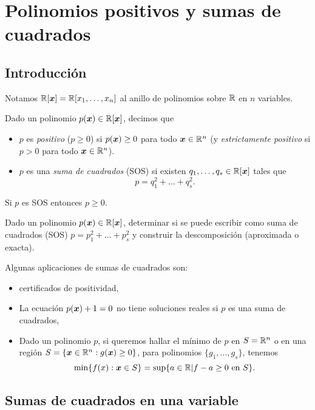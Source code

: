 \chapter{Polinomios positivos y sumas de cuadrados}

\section{Introducci\'on}


Notamos $\mathbb{R}[\bm{x}] = \mathbb{R}[x_1, \dots, x_n]$ al anillo de polinomios sobre $\mathbb{R}$ en $n$ variables.

Dado un polinomio $p(\bm{x}) \in \mathbb{R}[\bm{x}]$, decimos que
\begin{itemize}
\item $p$ es \emph{positivo} ($p \ge 0$) si $p(\bm{x}) \ge 0$ para todo $\bm{x} \in \mathbb{R}^n$ (y \emph{estrictamente positivo} si $p > 0$ para todo $\bm{x} \in \mathbb{R}^n$).
\item $p$ es una \emph{suma de cuadrados} (SOS) si existen $q_1, \dots, q_s \in \mathbb{R}[\bm{x}]$ tales que
$$
p = q_1^2 + \dots + q_s^2.
$$
\end{itemize}

\begin{prop}
Si $p$ es SOS entonces $p \ge 0$.
\end{prop}

\begin{problem}
Dado un polinomio $p(\bm{x}) \in \mathbb{R}[\bm{x}]$, determinar si se puede escribir como suma de cuadrados (SOS) $p = p_1^2 + \dots + p_s^2$ y construir la descomposici\'on (aproximada o exacta).
\end{problem}

Algunas aplicaciones de sumas de cuadrados son:
\begin{itemize}
\item certificados de positividad,
\item La ecuación $p(\bm{x}) + 1 = 0$ no tiene soluciones reales si $p$ es una suma de cuadrados,
\item Dado un polinomio $p$, si queremos hallar el mínimo de $p$ en $S = \mathbb{R}^n$ o en una regi\'on $S = \{ \bm{x} \in \mathbb{R}^n : g(\bm{x}) \ge 0\}$, para polinomios $\{g_1, \dots, g_s\}$, tenemos
\[
\min\{f(x) : \bm{x} \in S\} = \sup\{a \in \mathbb{R} | f - a \ge 0 \text{ en } S\}.
\]
\end{itemize}


\section{Sumas de cuadrados en una variable}

